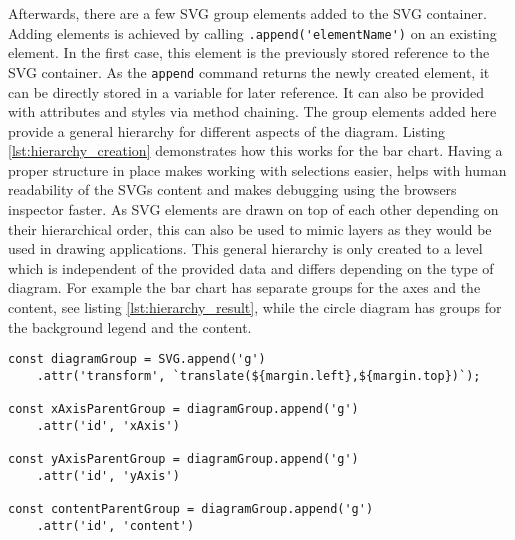 Afterwards, there are a few SVG group elements added to the SVG container. Adding elements is achieved by calling \verb|.append('elementName')| on an existing element. In the first case, this element is the previously stored reference to the SVG container. As the \verb|append| command returns the newly created element, it can be directly stored in a variable for later reference. It can also be provided with attributes and styles via method chaining. The group elements added here provide a general hierarchy for different aspects of the diagram. Listing \ref{lst:hierarchy_creation} demonstrates how this works for the bar chart. Having a proper structure in place makes working with selections easier, helps with human readability of the SVGs content and makes debugging using the browsers inspector faster. As SVG elements are drawn on top of each other depending on their hierarchical order, this can also be used to mimic layers as they would be used in drawing applications. This general hierarchy is only created to a level which is independent of the provided data and differs depending on the type of diagram. For example the bar chart has separate groups for the axes and the content, see listing \ref{lst:hierarchy_result}, while the circle diagram has groups for the background legend and the content.

\begin{minipage}{0.9\linewidth}
\begin{lstlisting}[style=htmlCSSjs, captionpos=b, caption={JavaScript code to create the hierarchy as used in the bar chart. The first line adds a new group element to the main SVG container using the \texttt{append} command. The newly added group element is saved in a constant for later references. Furthermore in line two an attribute is added to the new group element using the \texttt{attr} command and method chaining. It moves the group element from the left and top to allign with the margin definition. In each of the lines four, seven and ten, another group element is added. They are added to the previously created group element. They are all stored in constants for later reference and are provided with ID's for easier identification and debugging.}, label={lst:hierarchy_creation}]
const diagramGroup = SVG.append('g')
    .attr('transform', `translate(${margin.left},${margin.top})`);

const xAxisParentGroup = diagramGroup.append('g')
    .attr('id', 'xAxis')

const yAxisParentGroup = diagramGroup.append('g')
    .attr('id', 'yAxis')

const contentParentGroup = diagramGroup.append('g')
    .attr('id', 'content')
\end{lstlisting}
\end{minipage}


